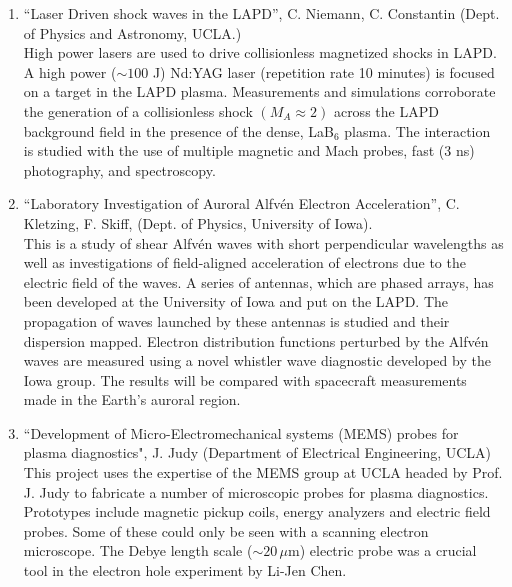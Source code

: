 \documentclass[11pt]{article}
\begin{document}
\begin{enumerate}

\item ``Laser Driven shock waves in the LAPD'', C. Niemann,
  C. Constantin (Dept. of Physics and Astronomy,
  UCLA.)\\ High power lasers are used to drive collisionless
  magnetized shocks in LAPD.  A high power ($\sim 100$ J) Nd:YAG laser (repetition rate 10
  minutes) is focused on a target in the LAPD plasma. Measurements and
  simulations corroborate the generation of a collisionless shock
  $(M_{A}\approx 2)$ across the LAPD background field in the presence
  of the dense, LaB$_{6}$ plasma. The interaction is studied with the
  use of multiple magnetic and Mach probes, fast (3 ns) photography, and
  spectroscopy.

\item ``Laboratory Investigation of Auroral Alfv\'{e}n Electron
  Acceleration'', C. Kletzing, F. Skiff, (Dept. of Physics, University
  of Iowa).\\ This is a study of shear Alfv\'{e}n waves with short
  perpendicular wavelengths as well as investigations of field-aligned
  acceleration of electrons due to the electric field of the waves. A
  series of antennas, which are phased arrays, has been developed at
  the University of Iowa and put on the LAPD. The propagation of waves
  launched by these antennas is studied and their dispersion
  mapped. Electron distribution functions perturbed by the Alfv\'{e}n
  waves are measured using a novel whistler wave diagnostic developed
  by the Iowa group. The results will be compared with spacecraft
  measurements made in the Earth's auroral region.

%

\item ``Development of Micro-Electromechanical systems (MEMS) probes for plasma diagnostics",
J. Judy (Department of Electrical Engineering, UCLA)
This project uses the expertise of the MEMS group at UCLA headed by Prof. J. Judy to fabricate a number of microscopic probes for plasma diagnostics.  Prototypes include magnetic pickup coils, energy analyzers and electric field probes.  Some of these could only be seen with a scanning electron microscope.  The Debye length scale ($\sim 20\, \mu$m) electric probe was a crucial tool in the electron hole experiment by Li-Jen Chen.  

\end{enumerate}
\end{document}
